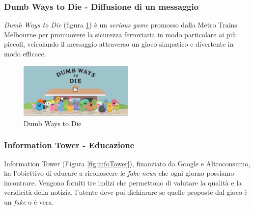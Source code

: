 \subsubsection{Dumb Ways to Die - Diffusione di un messaggio}
\textit{Dumb Ways to Die} \cite{dumbwaytodie} (figura \ref{fig:dumbwaytodie}) è un \textit{serious game} promosso dalla Metro Trains Melbourne per promuovere la sicurezza ferroviaria in modo particolare ai più piccoli, veicolando il messaggio attraverso un gioco simpatico e divertente in modo efficace.
\begin{figure} [h]
    \center
    \includegraphics[width=0.5\textwidth]{img/dumb-way-to-die.png}
    \caption{Dumb Ways to Die}
    \label{fig:dumbwaytodie}
\end{figure}

\subsubsection{Information Tower - Educazione}
Information Tower \cite{infoTower} (Figura \ref{fig:infoTower}), finanziato da Google e Altroconsumo, ha l'obiettivo di educare a riconoscere le \textit{fake news} che ogni giorno possiamo incontrare. Vengono forniti tre indizi che permettono di valutare la qualità e la veridicità della notizia, l'utente deve poi dichiarare se quelle proposte dal gioco è un \textit{fake} o è vera. 

